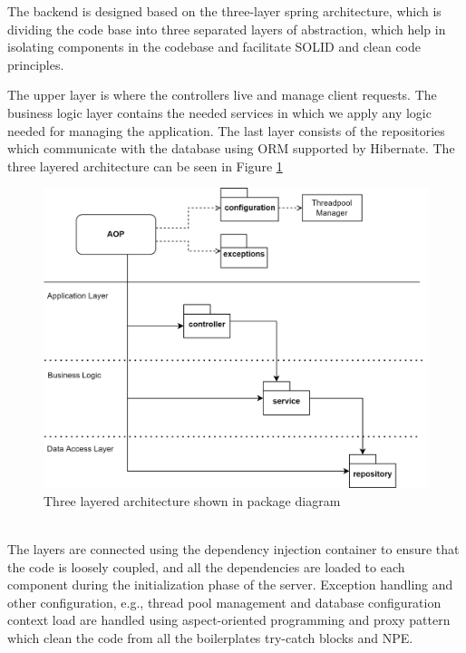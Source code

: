 The backend is designed based on the three-layer spring architecture, which is dividing the code base into three separated layers of abstraction, which help in isolating components in the codebase and facilitate SOLID and clean code principles. 

The upper layer is where the controllers live and manage client requests. The business logic layer contains the needed services in which we apply any logic needed for managing the application. The last layer consists of the repositories which communicate with the database using ORM supported by Hibernate. The three layered architecture can be seen in Figure \ref{fig:threelayerArch}
\\
\begin{figure}[h]
    \centering
    \includegraphics[width = .9\textwidth]{images/ThreeLayerArchitecture.png}
    \caption{Three layered architecture shown in package diagram}
    \label{fig:threelayerArch}
\end{figure}\\

The layers are connected using the dependency injection container to ensure that the code is loosely coupled, and all the dependencies are loaded to each component during the initialization phase of the server. Exception handling and other configuration, e.g., thread pool management and database configuration context load are handled using aspect-oriented programming and proxy pattern which clean the code from all the boilerplates try-catch blocks and NPE.
\newpage
